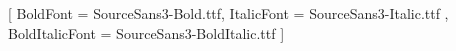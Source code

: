 
\usepackage{fontspec}

\setmainfont
[Path=./fonts/Source_Sans_3/static/]
{SourceSans3-Regular.ttf}[
BoldFont =  SourceSans3-Bold.ttf,
ItalicFont = SourceSans3-Italic.ttf ,
BoldItalicFont = SourceSans3-BoldItalic.ttf ]